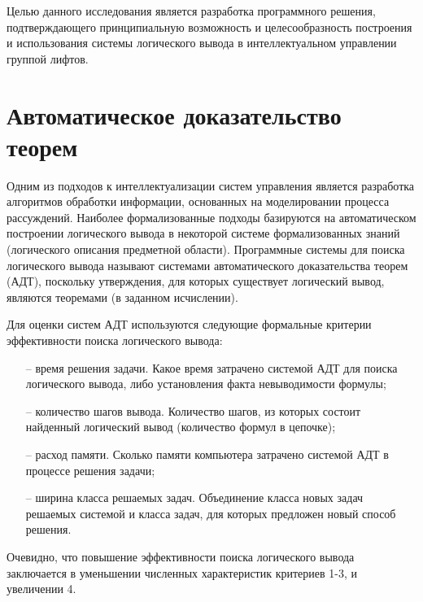 
	Целью данного исследования является разработка программного решения, подтверждающего принципиальную возможность и целесообразность построения и использования системы логического вывода в интеллектуальном управлении группой лифтов.

\section{Автоматическое доказательство теорем}
Одним из подходов к интеллектуализации систем управления является разработка алгоритмов обработки информации, основанных на моделировании процесса рассуждений. Наиболее формализованные подходы базируются на автоматическом построении логического вывода в некоторой системе формализованных знаний (логического описания предметной области). Программные системы для поиска логического вывода называют системами автоматического доказательства теорем (АДТ), поскольку утверждения, для которых существует логический вывод, являются теоремами (в заданном исчислении).

Для оценки систем АДТ используются следующие формальные критерии эффективности поиска логического вывода:

    \begin{itemize}
				\item[--] время решения задачи. Какое время затрачено системой АДТ для поиска логического вывода, либо установления факта невыводимости формулы;
				\item[--] количество шагов вывода. Количество шагов, из которых состоит найденный логический вывод (количество формул в цепочке);
				\item[--] расход памяти. Сколько памяти компьютера затрачено системой АДТ в процессе решения задачи;
				\item[--] ширина класса решаемых задач. Объединение класса новых задач решаемых системой и класса задач, для которых предложен новый способ решения.
    \end{itemize}
            
Очевидно, что повышение эффективности поиска логического вывода заключается в уменьшении численных характеристик критериев 1-3, и увеличении 4. 

